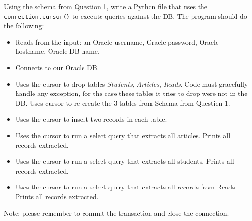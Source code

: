 \documentclass[letterpaper, 11pt]{article}
\begin{document}
Using the schema from Question 1, write a Python file that uses the \texttt{connection.cursor()} to execute queries against the DB. The program should do the following:
\begin{itemize}[label=-]
    \item Reads from the input: an Oracle username, Oracle password, Oracle hostname, Oracle DB name.
    \item Connects to our Oracle DB.
    \item Uses the cursor to drop tables \textit{Students}, \textit{Articles}, \textit{Reads}. Code must gracefully handle any exception, for the case these tables it tries to drop were not in the DB. Uses cursor to re-create the 3 tables from Schema from Question 1.
    \item Uses the cursor to insert two records in each table.
    \item Uses the cursor to run a select query that extracts all articles. Prints all records extracted.
    \item Uses the cursor to run a select query that extracts all students. Prints all records extracted.
    \item Uses the cursor to run a select query that extracts all records from Reads. Prints all records extracted.
\end{itemize}

Note: please remember to commit the transaction and close the connection.
\end{document}
